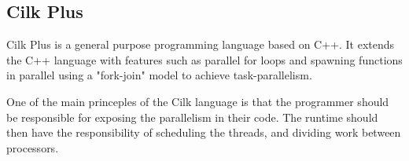 \subsection{Cilk Plus}

Cilk Plus is a general purpose programming language based on C++. It extends the C++ language with features such as
parallel for loops and spawning functions in parallel using a "fork-join" model to achieve task-parallelism.

One of the main princeples of the Cilk language is that the programmer should be responsible for exposing the parallelism
in their code. The runtime should then have the responsibility of scheduling the threads, and dividing work between
processors. 


